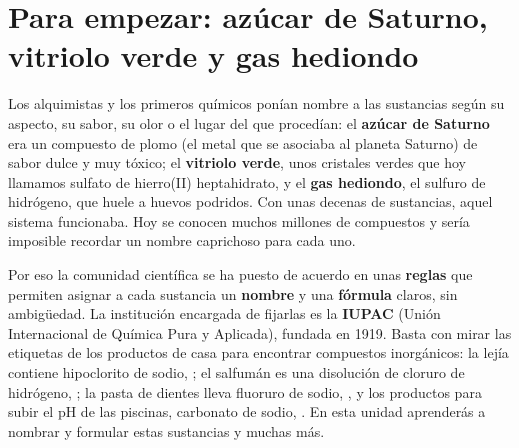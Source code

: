 
\sloppy %

\section*{Para empezar: azúcar de Saturno, vitriolo verde y gas hediondo}

Los alquimistas y los primeros químicos ponían nombre a las sustancias según su aspecto, su sabor, su olor o el lugar del que
procedían: el \textbf{azúcar de Saturno} era un compuesto de plomo (el metal que se asociaba al planeta Saturno) de sabor dulce
y muy tóxico; el \textbf{vitriolo verde}, unos cristales verdes que hoy llamamos sulfato de hierro(II) heptahidrato, y el
\textbf{gas hediondo}, el sulfuro de hidrógeno, que huele a huevos podridos. Con unas decenas de sustancias, aquel sistema
funcionaba. Hoy se conocen muchos millones de compuestos y sería imposible recordar un nombre caprichoso para cada uno.

Por eso la comunidad científica se ha puesto de acuerdo en unas \textbf{reglas} que permiten asignar a cada sustancia un
\textbf{nombre} y una \textbf{fórmula} claros, sin ambigüedad. La institución encargada de fijarlas es la \textbf{IUPAC} (Unión
Internacional de Química Pura y Aplicada), fundada en 1919. Basta con mirar las etiquetas de los productos de casa para encontrar
compuestos inorgánicos: la lejía contiene hipoclorito de sodio, ; el salfumán es una disolución de cloruro de
hidrógeno, ; la pasta de dientes lleva fluoruro de sodio, , y los productos para subir el pH de las piscinas,
carbonato de sodio, . En esta unidad aprenderás a nombrar y formular estas sustancias y muchas más.

